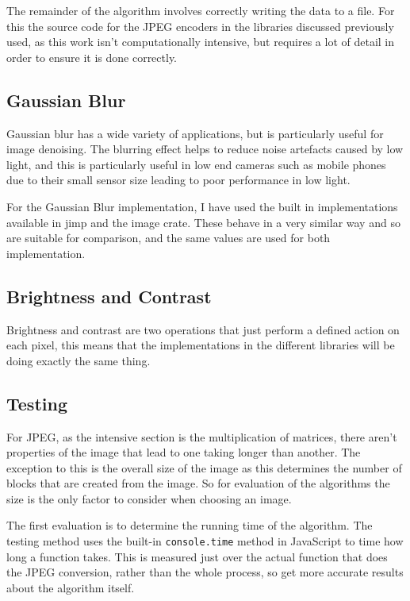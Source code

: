 \documentclass[12pt,a4paper]{article}
\begin{document}
The remainder of the algorithm involves correctly writing the data to a file. For this the source code for the JPEG encoders in the libraries discussed previously used, as this work isn't computationally intensive, but requires a lot of detail in order to ensure it is done correctly.

\subsection{Gaussian Blur}

Gaussian blur has a wide variety of applications, but is particularly useful for image denoising. The blurring effect helps to reduce noise artefacts caused by low light, and this is particularly useful in low end cameras such as mobile phones due to their small sensor size leading to poor performance in low light.


For the Gaussian Blur implementation, I have used the built in implementations available in jimp and the image crate. These behave in a very similar way and so are suitable for comparison, and the same values are used for both implementation.

\subsection{Brightness and Contrast}

Brightness and contrast are two operations that just perform a defined action on each pixel, this means that the implementations in the different libraries will be doing exactly the same thing.


\subsection{Testing}

For JPEG, as the intensive section is the multiplication of matrices, there aren't properties of the image that lead to one taking longer than another. The exception to this is the overall size of the image as this determines the number of blocks that are created from the image. So for evaluation of the algorithms the size is the only factor to consider when choosing an image.

The first evaluation is to determine the running time of the algorithm. The testing method uses the built-in \texttt{console.time} method in JavaScript to time how long a function takes. This is measured just over the actual function that does the JPEG conversion, rather than the whole process, so get more accurate results about the algorithm itself.
\end{document}
